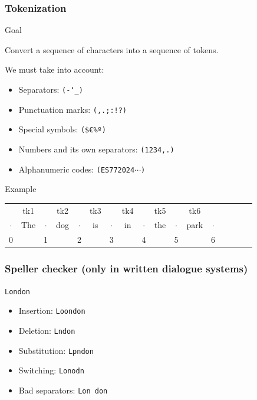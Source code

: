 \documentclass[11pt]{beamer}
\begin{document}
\begin{frame}[fragile]
	\frametitle{Tokenization}
	\begin{block}{Goal}
		\begin{center}
			Convert a sequence of characters into a sequence of tokens.
		\end{center}
	\end{block}
	\pause
	We must take into account:
	\begin{itemize}
		\item Separators: \texttt{(\textvisiblespace -\char`_)}
		\item Punctuation marks: \texttt{(,.;:!?)}
		\item Special symbols: \texttt{(\$\euro\%º)}
		\item Numbers and its own separators: \texttt{(1234,.)}
		\item Alphanumeric codes: \texttt{(ES772024$\cdots$)}
	\end{itemize}
	\pause
	\begin{block}{Example}
	\begin{center}
		\begin{tabular}{ c c c c c c c c c c c c c c c c c }
			& tk1 & & tk2 & & tk3 & & tk4 & & tk5 & & tk6 \\
			$\cdot$ & The & $\cdot$ & dog & $\cdot$ & is & $\cdot$ & in & $\cdot$ & the & $\cdot$ & park & $\cdot$\\
			0 & & 1 & & 2 & & 3 & & 4 & & 5 & & 6
		\end{tabular}
	\end{center}
	\end{block}
\end{frame}

\begin{frame}
\frametitle{Speller checker (only in written dialogue systems)}
\begin{center}
	\Huge \texttt{London}
\end{center}
\begin{itemize}
	\item Insertion: \texttt{Loondon} 
	\item Deletion: \texttt{Lndon} 
	\item Substitution: \texttt{Lpndon} 
	\item Switching: \texttt{Lonodn} 
	\item Bad separators: \texttt{Lon don} 
\end{itemize}
\end{frame}
\end{document}
